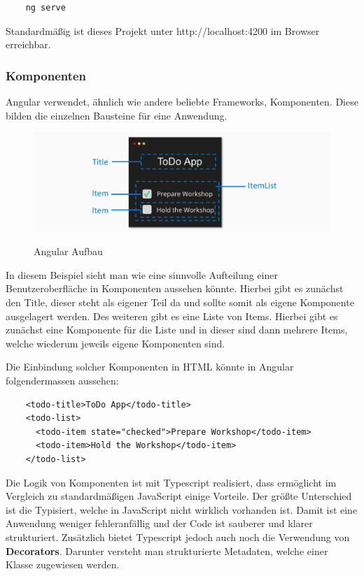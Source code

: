 \begin{lstlisting}
    ng serve
\end{lstlisting}

Standardmäßig ist dieses Projekt unter http://localhost:4200 im Browser erreichbar. 

\subsubsection{Komponenten}
Angular verwendet, ähnlich wie andere beliebte Frameworks, Komponenten. Diese bilden die einzelnen Bausteine für eine Anwendung.

\begin{figure}[h!]
    \centering
    \includegraphics[width=1\textwidth]{pics/angular-components.png }
    \caption{Angular Aufbau}
    \cite{frontend_web_angular_introduction}
    \label{fig:mesh1}
\end{figure}

In diesem Beispiel sieht man wie eine sinnvolle Aufteilung einer Benutzeroberfläche in Komponenten aussehen könnte. Hierbei gibt es zunächst den Title, dieser steht als eigener Teil da und sollte somit als eigene Komponente ausgelagert werden. Des weiteren gibt es eine Liste von Items. Hierbei gibt es zunächst eine Komponente für die Liste und in dieser sind dann mehrere Items, welche wiederum jeweils eigene Komponenten sind. 

Die Einbindung solcher Komponenten in HTML könnte in Angular folgendermassen aussehen:

\begin{lstlisting}
    <todo-title>ToDo App</todo-title>
    <todo-list>
      <todo-item state="checked">Prepare Workshop</todo-item>
      <todo-item>Hold the Workshop</todo-item>
    </todo-list>
\end{lstlisting}

Die Logik von Komponenten ist mit Typescript realisiert, dass ermöglicht im Vergleich zu standardmäßigen JavaScript einige Vorteile. Der größte Unterschied ist die Typisiert, welche in JavaScript nicht wirklich vorhanden ist. Damit ist eine Anwendung weniger fehleranfällig und der Code ist sauberer und klarer strukturiert. Zusätzlich bietet Typescript jedoch auch noch die Verwendung von \textbf{Decorators}. Darunter versteht man strukturierte Metadaten, welche einer Klasse zugewiesen werden. 

